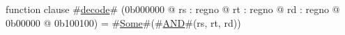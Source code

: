 function clause #\hyperref[zdecode]{decode}# (0b000000 @ rs : regno @ rt : regno @ rd : regno @ 0b00000 @ 0b100100) =
    #\hyperref[zSome]{Some}#(#\hyperref[zAND]{AND}#(rs, rt, rd))
